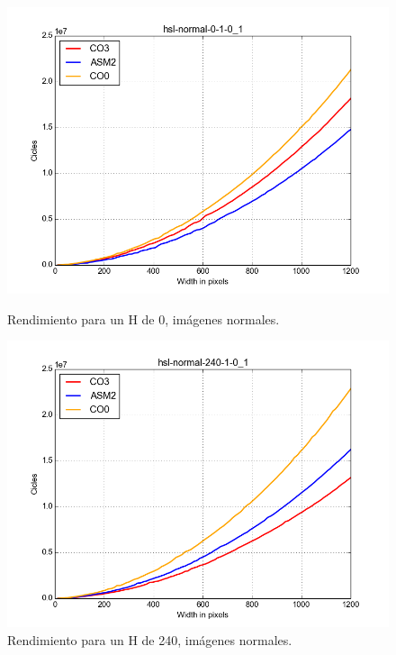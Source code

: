 \documentclass[a4paper]{article}
\begin{document}
\begin{figure}[H]
  \begin{center}
    \includegraphics[scale=0.4]{imagenes/hsl3.png}
    \caption{Rendimiento para un H de 0, imágenes normales.}
    \label{fig:exp1-1}
  \end{center}
  \endminipage\hfill
  \begin{center}
    \includegraphics[scale=0.4]{imagenes/hsl4.png}
    \caption{Rendimiento para un H de 240, imágenes normales.}
    \label{fig:exp1-0.5}
  \end{center}
  \endminipage\hfill
\end{figure}
\end{document}
